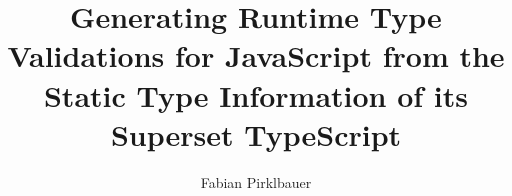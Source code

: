 \documentclass[master,english]{hgbthesis}
\title{Generating Runtime Type Validations for JavaScript from the Static Type Information of its Superset TypeScript}
\author{Fabian Pirklbauer}
\begin{document}

\frontmatter

\maketitle
\tableofcontents


			

\mainmatter









\appendix 




\MakeBibliography



\end{document}
